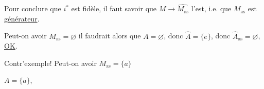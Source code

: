 

Pour conclure que $i^*$ est fidèle, 
il faut savoir que $M\longrightarrow\widehat{M_{\mathrm{as}}}$ l'est,
i.e. que $M_{\mathrm{as}}$ est \uline{générateur}.

Peut-on avoir $M_{\mathrm{as}}=\varnothing$ 
il faudrait alors que $A=\varnothing$, donc $\widehat A=\{e\}$,
donc $\widehat A_{\mathrm{as}}=\varnothing$, \uline{OK}.

Contr'exemple! Peut-on avoir $M_{\mathrm{as}}=\{a\}$

  $A=\{a\}$,

\margin{\unsure{(*)}}
